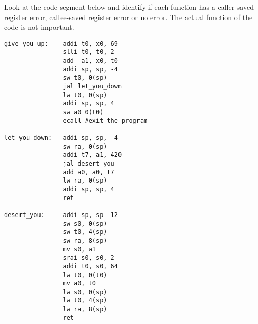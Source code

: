 \begin{blocksection}

\question 
Look at the code segment below and identify if each function has a caller-saved register error, callee-saved register error or no error. The actual function of the code is not important. 

\begin{verbatim}
give_you_up:	addi t0, x0, 69
				slli t0, t0, 2
				add  a1, x0, t0
				addi sp, sp, -4
				sw t0, 0(sp)
				jal let_you_down
				lw t0, 0(sp)
				addi sp, sp, 4
				sw a0 0(t0)
				ecall #exit the program
				
let_you_down:	addi sp, sp, -4
				sw ra, 0(sp)
				addi t7, a1, 420
				jal desert_you
				add a0, a0, t7
				lw ra, 0(sp)
				addi sp, sp, 4
				ret
				
desert_you:		addi sp, sp -12
				sw s0, 0(sp)
				sw t0, 4(sp)
				sw ra, 8(sp)
				mv s0, a1
				srai s0, s0, 2
				addi t0, s0, 64
				lw t0, 0(t0)
				mv a0, t0
				lw s0, 0(sp)
				lw t0, 4(sp)
				lw ra, 8(sp)
				ret 
\end{verbatim}

\end{blocksection}
